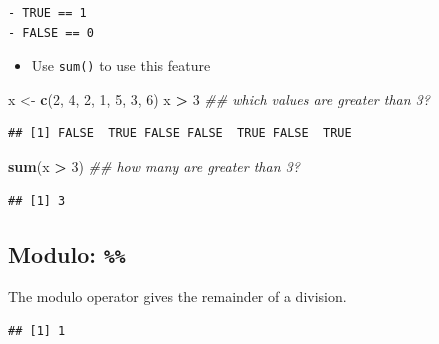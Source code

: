 \documentclass[]{book}
\newenvironment{Shaded}{\begin{snugshade}}{\end{snugshade}}
\newcommand{\CommentTok}[1]{\textcolor[rgb]{0.56,0.35,0.01}{\textit{#1}}}
\newcommand{\DecValTok}[1]{\textcolor[rgb]{0.00,0.00,0.81}{#1}}
\newcommand{\KeywordTok}[1]{\textcolor[rgb]{0.13,0.29,0.53}{\textbf{#1}}}
\newcommand{\NormalTok}[1]{#1}
\newcommand{\OperatorTok}[1]{\textcolor[rgb]{0.81,0.36,0.00}{\textbf{#1}}}
\newcommand{\StringTok}[1]{\textcolor[rgb]{0.31,0.60,0.02}{#1}}
\providecommand{\tightlist}{%
  \setlength{\itemsep}{0pt}\setlength{\parskip}{0pt}}
\begin{document}
\begin{verbatim}
- TRUE == 1
- FALSE == 0
\end{verbatim}

\begin{itemize}
\tightlist
\item
  Use \texttt{sum()} to use this feature
\end{itemize}

\begin{Shaded}
\begin{Highlighting}[]
\NormalTok{x <-}\StringTok{ }\KeywordTok{c}\NormalTok{(}\DecValTok{2}\NormalTok{, }\DecValTok{4}\NormalTok{, }\DecValTok{2}\NormalTok{, }\DecValTok{1}\NormalTok{, }\DecValTok{5}\NormalTok{, }\DecValTok{3}\NormalTok{, }\DecValTok{6}\NormalTok{)}
\NormalTok{x }\OperatorTok{>}\StringTok{ }\DecValTok{3} \CommentTok{## which values are greater than 3?}
\end{Highlighting}
\end{Shaded}

\begin{verbatim}
## [1] FALSE  TRUE FALSE FALSE  TRUE FALSE  TRUE
\end{verbatim}

\begin{Shaded}
\begin{Highlighting}[]
\KeywordTok{sum}\NormalTok{(x }\OperatorTok{>}\StringTok{ }\DecValTok{3}\NormalTok{) }\CommentTok{## how many are greater than 3?}
\end{Highlighting}
\end{Shaded}

\begin{verbatim}
## [1] 3
\end{verbatim}

\hypertarget{modulo}{%
\subsection{\texorpdfstring{Modulo: \texttt{\%\%}}{Modulo: \%\%}}\label{modulo}}

The modulo operator gives the remainder of a division.

\begin{Shaded}
\end{Shaded}

\begin{verbatim}
## [1] 1
\end{verbatim}
\end{document}
